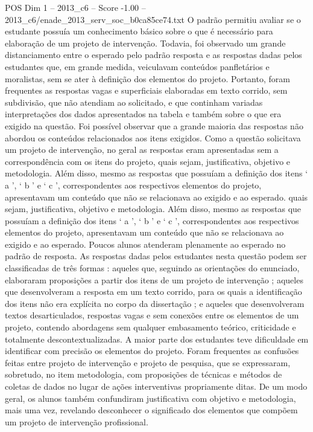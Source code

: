 \begin{textsample}{POS Dim 1 – 2013\_c6 – Score -1.00 – 2013\_c6/enade\_2013\_serv\_soc\_b0ca85ce74.txt}
O padrão permitiu avaliar se o estudante possuía um conhecimento básico sobre o que é necessário para elaboração de um projeto de intervenção.
Todavia, foi observado um grande distanciamento entre o esperado pelo padrão resposta e as respostas dadas pelos estudantes que, em grande medida, veiculavam conteúdos panfletários e moralistas, sem se ater à definição dos elementos do projeto.
Portanto, foram frequentes as respostas vagas e superficiais elaboradas em texto corrido, sem subdivisão, que não atendiam ao solicitado, e que continham variadas interpretações dos dados apresentados na tabela e também sobre o que era exigido na questão.
Foi possível observar que a grande maioria das respostas não abordou os conteúdos relacionados aos itens exigidos.
Como a questão solicitava um projeto de intervenção, no geral as respostas eram apresentadas sem a correspondência com os itens do projeto, quais sejam, justificativa, objetivo e metodologia.
Além disso, mesmo as respostas que possuíam a definição dos itens ‘ a ’, ‘ b ’ e ‘ c ’, correspondentes aos respectivos elementos do projeto, apresentavam um conteúdo que não se relacionava ao exigido e ao esperado. quais sejam, justificativa, objetivo e metodologia.
Além disso, mesmo as respostas que possuíam a definição dos itens ‘ a ’, ‘ b ’ e ‘ c ’, correspondentes aos respectivos elementos do projeto, apresentavam um conteúdo que não se relacionava ao exigido e ao esperado.
Poucos alunos atenderam plenamente ao esperado no padrão de resposta.
As respostas dadas pelos estudantes nesta questão podem ser classificadas de três formas : aqueles que, seguindo as orientações do enunciado, elaboraram proposições a partir dos itens de um projeto de intervenção ; aqueles que desenvolveram a resposta em um texto corrido, para os quais a identificação dos itens não era explícita no corpo da dissertação ; e aqueles que desenvolveram textos desarticulados, respostas vagas e sem conexões entre os elementos de um projeto, contendo abordagens sem qualquer embasamento teórico, criticidade e totalmente descontextualizadas.
A maior parte dos estudantes teve dificuldade em identificar com precisão os elementos do projeto.
Foram frequentes as confusões feitas entre projeto de intervenção e projeto de pesquisa, que se expressaram, sobretudo, no item metodologia, com proposições de técnicas e métodos de coletas de dados no lugar de ações interventivas propriamente ditas.
De um modo geral, os alunos também confundiram justificativa com objetivo e metodologia, mais uma vez, revelando desconhecer o significado dos elementos que compõem um projeto de intervenção profissional.

\end{textsample}
